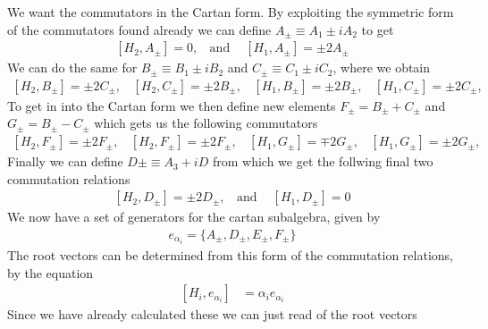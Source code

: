 \documentclass[a4paper,12pt]{article}
\begin{document}
We want the commutators in the Cartan form. By exploiting the symmetric form of the commutators found already we can define $A_{\pm}\equiv A_1\pm i A_2$ to get
\begin{equation}
	\begin{aligned}
		\left[H_2,A_{\pm}\right]=0, ~~~~\text{and }~~~~\left[H_1,A_\pm\right]=\pm 2 A_\pm
	\end{aligned}
\end{equation}
We can do the same for $B_\pm\equiv B_1\pm i B_2$ and $C_\pm\equiv C_1\pm i C_2$, where we obtain
\begin{equation}
	\begin{aligned}
		\left[H_2,B_{\pm}\right]=\pm 2C_\pm, ~~~~\left[H_2,C_\pm\right]=\pm 2 B_\pm,~~~~\left[H_1,B_\pm\right]=\pm 2 B_\pm,~~~~\left[H_1,C_\pm\right]=\pm 2 C_\pm,
	\end{aligned}
\end{equation}
To get in into the Cartan form we then define new elements $F_\pm=B_\pm+C_\pm$ and $G_\pm=B_\pm-C_\pm$ which gets us the following commutators
\begin{equation}
	\begin{aligned}
		\left[H_2,F_{\pm}\right]=\pm 2F_\pm, ~~~~\left[H_2,F_\pm\right]=\pm 2 F_\pm,~~~~\left[H_1,G_\pm\right]=\mp 2 G_\pm,~~~~\left[H_1,G_\pm\right]=\pm 2 G_\pm,
	\end{aligned}
\end{equation}
Finally we can define $D\pm\equiv A_3+iD$ from which we get the follwing final two commutation relations
\begin{equation}
	\begin{aligned}
		\left[H_2,D_{\pm}\right]=\pm2 D_\pm, ~~~~\text{and }~~~~\left[H_1,D_\pm\right]=0
	\end{aligned}
\end{equation}
We now have a set of generators for the cartan subalgebra, given by
\begin{equation}
	\begin{aligned}
		e_{\alpha_i}=\{A_\pm,D_\pm,E_\pm,F_\pm\}
	\end{aligned}
\end{equation}
The root vectors can be determined from this form of the commutation relations, by the equation
\begin{equation}
	\begin{aligned}
		\left[H_i,e_{\alpha_i}\right]&=\alpha_i e_{\alpha_i}
	\end{aligned}
\end{equation}
Since we have already calculated these we can just read of the root vectors
\end{document}
